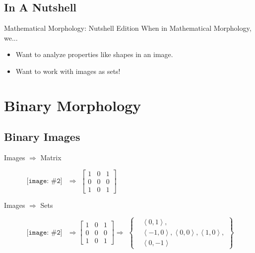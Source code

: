 \documentclass{beamer}
\newcommand{\pic}[2]{
     \begin{array}{l}
      \texttt{[image: \#2]}
      \end{array}
}
\newcommand{\set}[1]{\left\lbrace #1 \right\rbrace}
\newcommand{\tuple}[1]{\left\langle #1 \right\rangle}
\begin{document}
\subsection{In A Nutshell}
\begin{frame}{Mathematical Morphology: Nutshell Edition}
  When in Mathematical Morphology, we...
  \begin{itemize}
    \item Want to analyze properties like shapes in an image.
    \item Want to work with images as sets!
  \end{itemize} 
\end{frame}

\section{Binary Morphology}

\subsection{Binary Images}
\begin{frame}{Images $\Rightarrow$ Matrix}
\begin{figure}
\centering
$\pic{width=50pt}{images/cross.png}$
$\Rightarrow$
$\begin{bmatrix}
  1 & 0 & 1\\
  0 & 0 & 0\\
  1 & 0 & 1
\end{bmatrix}$
\end{figure}
\end{frame}

\begin{frame}{Images $\Rightarrow$ Sets}
\begin{figure}
\centering
$\pic{width=50pt}{images/cross.png}  $
$\Rightarrow
\begin{bmatrix}
  1 & 0 & 1\\
  0 & 0 & 0\\
  1 & 0 & 1
\end{bmatrix}
\Rightarrow$
$\set{\begin{aligned}
      &\tuple{0,1},\\
      &\tuple{-1,0},\tuple{0,0},\tuple{1,0},\\
      &\tuple{0,-1}
      \end{aligned}}$
\end{figure}
\end{frame}
\end{document}
